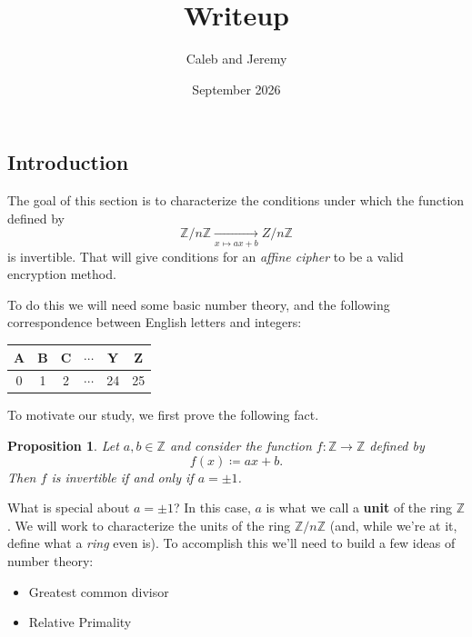 \documentclass{article}
\title{Writeup}
\author{Caleb and Jeremy}
\date{September 2026}
\newcommand{\blue}[1]{ {\color{blue}{#1}} }
\newcommand{\Z}{\mathbb{Z}}
\theoremstyle{plain}
\newtheorem{proposition}{Proposition}
\begin{document}
\maketitle

\section{}


\subsection{Introduction}

The goal of this section is to characterize the conditions under which the function defined by
\[ 
    \Z/n\Z \xrightarrow[x \mapsto ax+b]{} Z/n\Z
\]
is invertible.
That will give conditions for an \textit{affine cipher} to be a valid encryption method.

To do this we will need some basic number theory, and the following correspondence
between English letters and integers:
\begin{center}
\begin{tabular}{c|c|c|c|c|c}
    A & B & C & $\cdots$ & Y & Z  \\ \hline
    0 & 1 & 2 & $\cdots$ & 24 & 25
\end{tabular}
\end{center}

To motivate our study, we first prove the following fact.

\begin{proposition}
    Let $a,b \in \Z$ and consider the function $f: \Z \to \Z$ defined by 
    \[
        f(x) \coloneqq ax + b.
    \]
    Then $f$ is invertible if and only if $a=\pm1$.
\end{proposition}

\blue{
\begin{proof}
    Suppose $g(x) = cx + d$ and that $g$ is the inverse of $f$.
    That is, $f(g(x)) = x = g(f(x))$.....
\end{proof}
}

What is special about $a=\pm1$?
In this case, $a$ is what we call a \textbf{unit} of the ring $\Z$.
We will work to characterize the units of the ring $\Z/n\Z$ 
(and, while we're at it, define what a \textit{ring} even is).
To accomplish this we'll need to build a few ideas of number theory:
\begin{itemize}
    \item Greatest common divisor 
    \item Relative Primality
\end{itemize}
\end{document}
